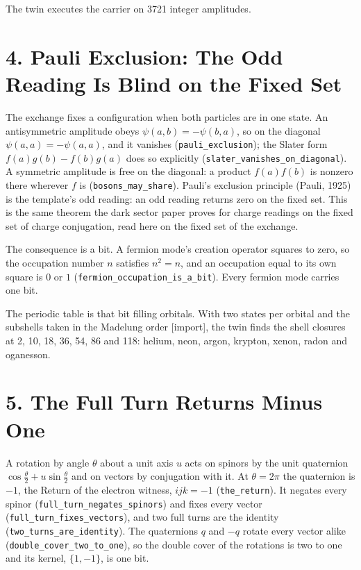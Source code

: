 \documentclass[10pt]{article}
\begin{document}
The twin executes the carrier on 3721 integer amplitudes.

\hypertarget{pauli-exclusion-the-odd-reading-is-blind-on-the-fixed-set}{%
\section{4. Pauli Exclusion: The Odd Reading Is Blind on the Fixed
Set}\label{pauli-exclusion-the-odd-reading-is-blind-on-the-fixed-set}}

The exchange fixes a configuration when both particles are in one state.
An antisymmetric amplitude obeys \(\psi(a,b)=-\psi(b,a)\), so on the
diagonal \(\psi(a,a)=-\psi(a,a)\), and it vanishes
(\texttt{pauli\_exclusion}); the Slater form \(f(a)g(b)-f(b)g(a)\) does
so explicitly (\texttt{slater\_vanishes\_on\_diagonal}). A symmetric
amplitude is free on the diagonal: a product \(f(a)f(b)\) is nonzero
there wherever \(f\) is (\texttt{bosons\_may\_share}). Pauli's exclusion
principle (Pauli, 1925) is the template's odd reading: an odd reading
returns zero on the fixed set. This is the same theorem the dark sector
paper proves for charge readings on the fixed set of charge conjugation,
read here on the fixed set of the exchange.

The consequence is a bit. A fermion mode's creation operator squares to
zero, so the occupation number \(n\) satisfies \(n^2=n\), and an
occupation equal to its own square is \(0\) or \(1\)
(\texttt{fermion\_occupation\_is\_a\_bit}). Every fermion mode carries
one bit.

The periodic table is that bit filling orbitals. With two states per
orbital and the subshells taken in the Madelung order {[}import{]}, the
twin finds the shell closures at 2, 10, 18, 36, 54, 86 and 118: helium,
neon, argon, krypton, xenon, radon and oganesson.

\hypertarget{the-full-turn-returns-minus-one}{%
\section{5. The Full Turn Returns Minus
One}\label{the-full-turn-returns-minus-one}}

A rotation by angle \(\theta\) about a unit axis \(u\) acts on spinors
by the unit quaternion \(\cos\frac\theta2+u\sin\frac\theta2\) and on
vectors by conjugation with it. At \(\theta=2\pi\) the quaternion is
\(-1\), the Return of the electron witness, \(ijk=-1\)
(\texttt{the\_return}). It negates every spinor
(\texttt{full\_turn\_negates\_spinors}) and fixes every vector
(\texttt{full\_turn\_fixes\_vectors}), and two full turns are the
identity (\texttt{two\_turns\_are\_identity}). The quaternions \(q\) and
\(-q\) rotate every vector alike (\texttt{double\_cover\_two\_to\_one}),
so the double cover of the rotations is two to one and its kernel,
\(\{1,-1\}\), is one bit.
\end{document}

